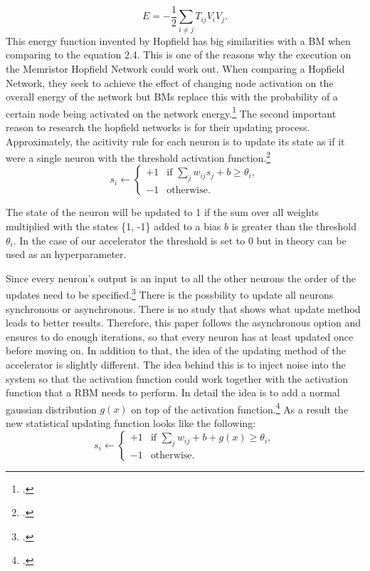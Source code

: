 \begin{equation}
    E = -\frac{1}{2} \sum_{i \neq j} T_{ij} V_i V_j .
\end{equation}
This energy function invented by Hopfield has big similarities with a \ac{BM} when comparing to the
equation 2.4. This is one of the reasons why the execution on the Memristor Hopfield Network could work out.
When comparing a Hopfield Network, they seek to achieve the effect of changing node activation on the overall energy of the network but \ac{BM}s replace this with the probability of a certain node being activated on the network energy.\footcite[cf.][7]{ahadNeuralNetworksWireless2016}
The second important reason to research the hopfield networks is for their updating process.
Approximately, the acitivity rule for each neuron is to update its state as if it were a single neuron with the threshold activation function.\footcite[cf.][506]{mackayInformationTheoryInference2003}
\[
s_i \leftarrow 
\begin{cases} 
+1 & \text{if } \sum_j w_{ij} s_j + b \geq \theta_i, \\
-1 & \text{otherwise}.
\end{cases}
\]

The state of the neuron will be updated to 1 if the sum over all weights multiplied with the states \{1, -1\} added to a bias \( b \)  is greater than the threshold \( \theta_i \).
In the case of our accelerator the threshold is set to 0 but in theory can be used as an hyperparameter.

Since every neuron's output is an input to all the other neurons the order of the updates need to be specified.\footcite[cf.][506]{mackayInformationTheoryInference2003}
There is the possbility to update all neurons synchronous or asynchronous. 
There is no study that shows what update method leads to better results.
Therefore, this paper follows the asynchronous option and ensures to do enough iterations, so that every neuron has at least updated once before moving on.
In addition to that, the idea of the updating method of the accelerator is slightly different. The idea behind this is to inject noise into the system so that the activation function could work together with the activation function that a \ac{RBM} needs to perform. 
In detail the idea is to add a normal gaussian distribution \( g(x) \) on top of the activation function.\footcite[cf.][4-5]{bohmNoiseinjectedAnalogIsing2022}
As a result the new statistical updating function looks like the following:
\[
s_i \leftarrow 
\begin{cases} 
+1 & \text{if } \sum_j w_{ij}  + b + g(x) \geq \theta_i, \\
-1 & \text{otherwise}.
\end{cases}
\]

